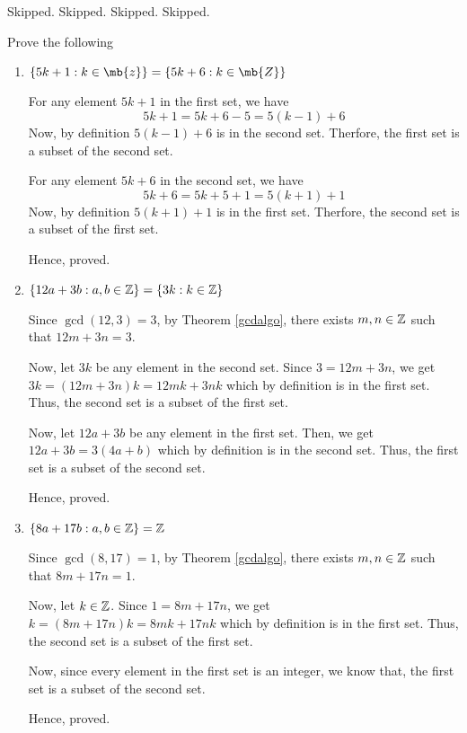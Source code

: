 \bp Skipped.\ep 
\bp Skipped.\ep 
\bp Skipped.\ep 
\bp Skipped.\ep 

\bp 
	Prove the following
	\begin{enumerate}
		\item $\{5k+1 : k \in \mb{z} \} = \{ 5k + 6 : k \in \mb{Z} \}$
			
		\bs
			For any element $5k+1$ in the first set, we have 
			$$5k + 1 = 5k+6-5 = 5(k-1) + 6$$
			Now, by definition $5(k-1)+6$ is in the second set.
			Therfore, the first set is a subset of the second set.

			For any element $5k+6$ in the second set, we have
			$$5k+6 = 5k+5+1 = 5(k+1)+1$$
			Now, by definition $5(k+1)+1$ is in the first set.
			Therfore, the second set is a subset of the first set.

			Hence, proved.
		\es
		
	\item $\{ 12a + 3b : a, b \in \mathbb{Z} \} = \{ 3k : k \in \mathbb{Z} \}$

		\bs
			Since $\gcd(12, 3) = 3$, by Theorem \ref{gcdalgo}, there exists $m, n \in \mathbb{Z}$ such that $12m+3n = 3$.

			Now, let $3k$ be any element in the second set. Since $3 = 12m + 3n$, we get $3k = (12m+3n)k = 12mk + 3nk$ which by definition is in the first set.
			Thus, the second set is a subset of the first set.

			Now, let $12a + 3b$ be any element in the first set. Then, we get $12a+3b = 3(4a+b)$ which by definition is in the second set.
			Thus, the first set is a subset of the second set.

			Hence, proved.
		\es

	\item $\{8a+17b: a, b \in \mathbb{Z} \} = \mathbb{Z}$

		\bs
			Since $\gcd(8, 17) = 1$, by Theorem \ref{gcdalgo}, there exists $m, n \in \mathbb{Z}$ such that $8m+17n = 1$.

			Now, let $k \in \mathbb{Z}$. Since $1 = 8m + 17n$, we get $k = (8m+17n)k = 8mk + 17nk$ which by definition is in the first set.
			Thus, the second set is a subset of the first set.

			Now, since every element in the first set is an integer, we know that, the first set is a subset of the second set.

			Hence, proved.
		\es
	\end{enumerate}
\ep 


